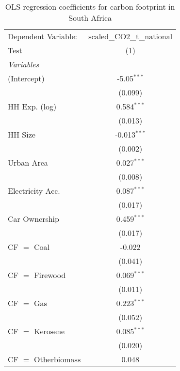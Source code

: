 
\begin{table}[htbp!]
   \centering
   \small
   \begin{adjustbox}{width = 1\textwidth, max height = 0.95\textheight, center}
      \begin{threeparttable}[b]
         \caption{\label{tab:OLS_2_ZAF} OLS-regression coefficients for carbon footprint in South Africa}
         \begin{tabular}{lc}
            \tabularnewline \midrule \midrule
            Dependent Variable: & scaled\_CO2\_t\_national\\     
            Test                & (1)\\  
            \midrule
            \emph{Variables}\\
            (Intercept)         & -5.05$^{***}$\\   
                                & (0.099)\\   
            HH Exp. (log)       & 0.584$^{***}$\\   
                                & (0.013)\\   
            HH Size             & -0.013$^{***}$\\   
                                & (0.002)\\   
            Urban Area          & 0.027$^{***}$\\   
                                & (0.008)\\   
            Electricity Acc.    & 0.087$^{***}$\\   
                                & (0.017)\\   
            Car Ownership       & 0.459$^{***}$\\   
                                & (0.017)\\   
            CF $=$ Coal         & -0.022\\   
                                & (0.041)\\   
            CF $=$ Firewood     & 0.069$^{***}$\\   
                                & (0.011)\\   
            CF $=$ Gas          & 0.223$^{***}$\\   
                                & (0.052)\\   
            CF $=$ Kerosene     & 0.085$^{***}$\\   
                                & (0.020)\\   
            CF $=$ Otherbiomass & 0.048\\   

\end{tabular}
\end{threeparttable}
\end{adjustbox}
\end{table}
